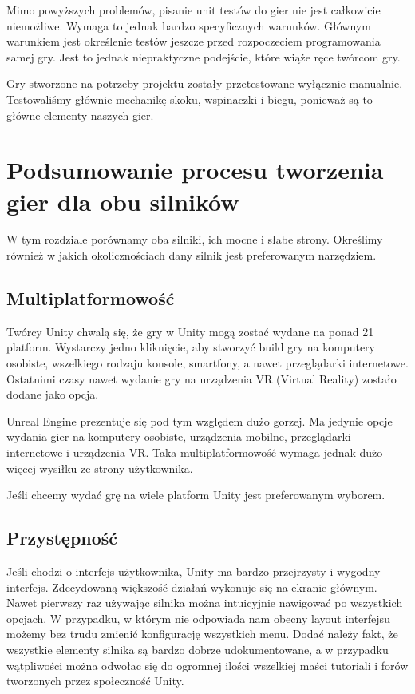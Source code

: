 \documentclass[brudnopis]{xmgr}
\begin{document}
Mimo powyższych problemów, pisanie unit testów do gier nie jest całkowicie niemożliwe. Wymaga to jednak bardzo specyficznych warunków. Głównym warunkiem jest określenie testów jeszcze przed rozpoczeciem programowania samej gry. Jest to jednak niepraktyczne podejście, które wiąże ręce twórcom gry.

Gry stworzone na potrzeby projektu zostały przetestowane wyłącznie manualnie. Testowaliśmy głównie mechanikę skoku, wspinaczki i biegu, ponieważ są to główne elementy naszych gier.



\chapter{Podsumowanie procesu tworzenia gier dla obu silników}

W tym rozdziale porównamy  oba silniki, ich mocne i słabe strony. Określimy również w jakich okolicznościach dany silnik jest preferowanym narzędziem.

\section{Multiplatformowość}

Twórcy Unity chwalą się, że gry w Unity mogą zostać wydane na ponad 21 platform. Wystarczy jedno kliknięcie, aby stworzyć build gry na komputery osobiste, wszelkiego rodzaju konsole, smartfony, a nawet przeglądarki internetowe. Ostatnimi czasy nawet wydanie gry na urządzenia VR (Virtual Reality) zostało dodane jako opcja.

Unreal Engine prezentuje się pod tym względem dużo gorzej. Ma jedynie opcje wydania gier na komputery osobiste, urządzenia mobilne, przeglądarki internetowe i urządzenia VR. Taka multiplatformowość wymaga jednak dużo więcej wysiłku ze strony użytkownika.

Jeśli chcemy wydać grę na wiele platform Unity jest preferowanym wyborem.

\section{Przystępność}

Jeśli chodzi o interfejs użytkownika, Unity ma bardzo przejrzysty i wygodny interfejs. Zdecydowaną większość działań wykonuje się na ekranie głównym. Nawet pierwszy raz używając silnika można intuicyjnie nawigować po wszystkich opcjach.
W przypadku, w którym nie odpowiada nam obecny layout interfejsu możemy bez trudu zmienić konfigurację wszystkich menu.
Dodać należy fakt, że wszystkie elementy silnika są bardzo dobrze udokumentowane, a w przypadku wątpliwości można odwołac się do ogromnej ilości wszelkiej maści tutoriali i forów tworzonych przez społeczność Unity.
\end{document}

